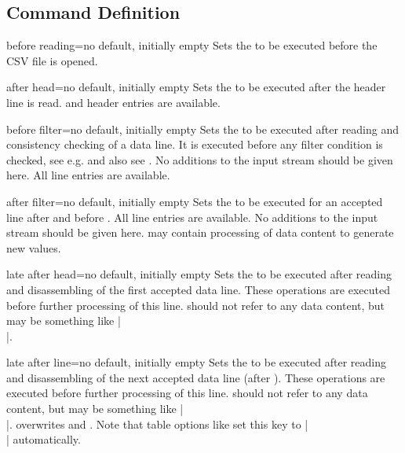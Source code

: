 \documentclass[a4paper,11pt]{ltxdoc}
\begin{document}
\subsection{Command Definition}%

\begin{docCsvKey}{before reading}{=}{no default, initially empty}
  Sets the  to be executed before the CSV file is opened.
\end{docCsvKey}

\begin{docCsvKey}{after head}{=}{no default, initially empty}
  Sets the  to be executed after the header line is read.
   and header entries are available.
\end{docCsvKey}

\begin{docCsvKey}{before filter}{=}{no default, initially empty}
  Sets the  to be executed after reading and consistency checking
  of a data line. It is executed before any filter condition is checked,
  see e.g.  and
  also see .
  No additions to the input stream should be given here.
  All line entries are available.
\end{docCsvKey}

\begin{docCsvKey}[][doc new=2021-07-06]{after filter}{=}{no default, initially empty}
  Sets the  to be executed for an accepted line after
   and before .
  All line entries are available.
  No additions to the input stream should be given here.  may
  contain processing of data content to generate new values.
\end{docCsvKey}

\begin{docCsvKey}{late after head}{=}{no default, initially empty}
  Sets the  to be executed after reading and disassembling
  of the first accepted data line.
  These operations are executed before further processing of this line.
   should not refer to any data content, but may be something
  like |\\|.
\end{docCsvKey}

\begin{docCsvKey}{late after line}{=}{no default, initially empty}
  Sets the  to be executed after reading and disassembling
  of the next accepted data line (after ).
  These operations are executed before further processing of this line.
   should not refer to any data content, but may be something
  like |\\|.
   overwrites
   and
  .
  Note that table options like  set this key to |\\|
  automatically.
\end{docCsvKey}
\end{document}
